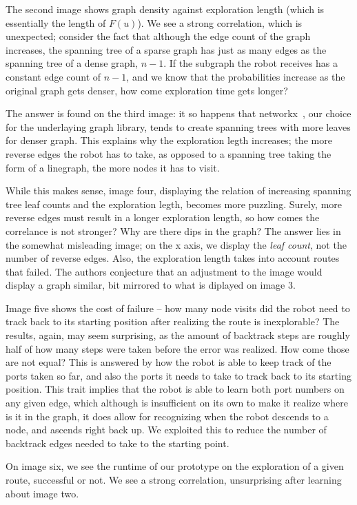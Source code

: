 \documentclass{article}
\begin{document}
The second image shows graph density against exploration length (which is essentially the length of $F(u)$). We see a strong correlation, which is unexpected; consider the fact that although the edge count of the graph increases, the spanning tree of a sparse graph has just as many edges as the spanning tree of a dense graph, $n-1$. If the subgraph the robot receives has a constant edge count of $n-1$, and we know that the probabilities increase as the original graph gets denser, how come exploration time gets longer?

The answer is found on the third image: it so happens that networkx~\cite{hagbergnetworkx}, our choice for the underlaying graph library, tends to create spanning trees with more leaves for denser graph. This explains why the exploration legth increases; the more reverse edges the robot has to take, as opposed to a spanning tree taking the form of a linegraph, the more nodes it has to visit.

While this makes sense, image four, displaying the relation of increasing spanning tree leaf counts and the exploration legth, becomes more puzzling. Surely, more reverse edges must result in a longer exploration length, so how comes the correlance is not stronger? Why are there dips in the graph? The answer lies in the somewhat misleading image; on the x axis, we display the \textit{leaf count}, not the number of reverse edges. Also, the exploration length takes into account routes that failed. The authors conjecture that an adjustment to the image would display a graph similar, bit mirrored to what is diplayed on image 3.

Image five shows the cost of failure -- how many node visits did the robot need to track back to its starting position after realizing the route is inexplorable? The results, again, may seem surprising, as the amount of backtrack steps are roughly half of how many steps were taken before the error was realized. How come those are not equal? This is answered by how the robot is able to keep track of the ports taken so far, and also the ports it needs to take to track back to its starting position. This trait implies that the robot is able to learn both port numbers on any given edge, which although is insufficient on its own to make it realize where is it in the graph, it does allow for recognizing when the robot descends to a node, and ascends right back up. We exploited this to reduce the number of backtrack edges needed to take to the starting point.

On image six, we see the runtime of our prototype on the exploration of a given route, successful or not. We see a strong correlation, unsurprising after learning about image two.
\end{document}
